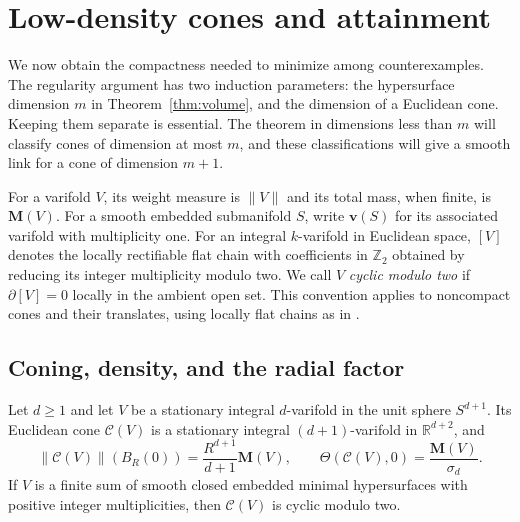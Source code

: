 \section{Low-density cones and attainment}\label{sec:cones}

We now obtain the compactness needed to minimize among counterexamples.
The regularity argument has two induction parameters: the hypersurface
dimension $m$ in Theorem~\ref{thm:volume}, and the dimension of a Euclidean
cone.  Keeping them separate is essential.  The theorem in dimensions
less than $m$ will classify cones of dimension at most $m$, and these
classifications will give a smooth link for a cone of dimension $m+1$.

For a varifold $V$, its weight measure is
$\|V\|$ and its total mass, when finite, is $\mathbf M(V)$.
For a smooth embedded submanifold $S$, write $\mathbf v(S)$ for its
associated varifold with multiplicity one.
For an integral $k$-varifold in Euclidean space, $[V]$ denotes the
locally rectifiable flat chain with coefficients in $\mathbb Z_2$
obtained by reducing its integer multiplicity modulo two.  We call
$V$ \emph{cyclic modulo two} if $\partial[V]=0$ locally in the ambient
open set.  This convention applies to noncompact cones and their
translates, using locally flat chains as in
\cite[\S2.1 and Appendix]{White2009}.

\subsection{Coning, density, and the radial factor}

\begin{lemma}\label{lem:cone-operation}
Let $d\geq1$ and let $V$ be a stationary integral $d$-varifold in the
unit sphere $S^{d+1}$.  Its Euclidean cone $\mathcal C(V)$ is a
stationary integral $(d+1)$-varifold in $\mathbb R^{d+2}$, and
\begin{equation}\label{eq:cones-mass}
 \|\mathcal C(V)\|(B_R(0))
   =\frac{R^{d+1}}{d+1}\mathbf M(V),
 \qquad
 \Theta(\mathcal C(V),0)=\frac{\mathbf M(V)}{\sigma_d}.
\end{equation}
If $V$ is a finite sum of smooth closed embedded minimal
hypersurfaces with positive integer multiplicities, then
$\mathcal C(V)$ is cyclic modulo two.
\end{lemma}


